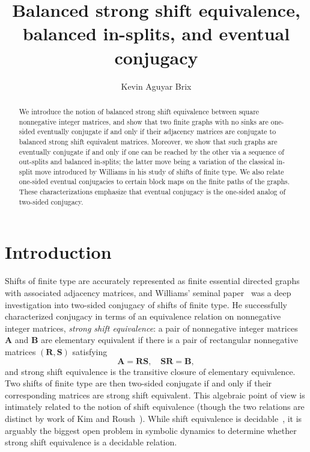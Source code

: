\documentclass[12pt,a4paper,oneside,reqno,final]{amsart}
\title[Eventual conjugacy]{Balanced strong shift equivalence, balanced in-splits, and eventual conjugacy}
\author[K.A. Brix]{Kevin Aguyar Brix}
\theoremstyle{definition}
\numberwithin{equation}{section} %
\begin{document}
\begin{abstract}
    We introduce the notion of balanced strong shift equivalence between square nonnegative integer matrices, 
    and show that two finite graphs with no sinks are one-sided eventually conjugate if and only if their adjacency matrices are conjugate to balanced strong shift equivalent matrices.
    Moreover, we show that such graphs are eventually conjugate if and only if one can be reached by the other via a sequence of out-splits and balanced in-splits;
    the latter move being a variation of the classical in-split move introduced by Williams in his study of shifts of finite type.
    We also relate one-sided eventual conjugacies to certain block maps on the finite paths of the graphs.
    These characterizations emphasize that eventual conjugacy is the one-sided analog of two-sided conjugacy.
\end{abstract}
\maketitle




\section{Introduction}
Shifts of finite type are accurately represented as finite essential directed graphs with associated adjacency matrices,
and Williams' seminal paper~\cite{Williams1973} was a deep investigation into two-sided conjugacy of shifts of finite type.
He successfully characterized conjugacy in terms of an equivalence relation on nonnegative integer matrices, \emph{strong shift equivalence}:
a pair of nonnegative integer matrices \textbf{A} and \textbf{B} are elementary equivalent if there is a pair of rectangular nonnegative matrices $(\textbf{R}, \textbf{S})$ satisfying
\[
    \textbf{A} = \textbf{R} \textbf{S}, \quad \textbf{S} \textbf{R} = \textbf{B},
\]
and strong shift equivalence is the transitive closure of elementary equivalence.
Two shifts of finite type are then two-sided conjugate if and only if their corresponding matrices are strong shift equivalent.
This algebraic point of view is intimately related to the notion of shift equivalence (though the two relations are distinct by work of Kim and Roush~\cite{Kim-Roush}).
While shift equivalence is decidable~\cite{Kim-Roush1988}, it is arguably the biggest open problem in symbolic dynamics to determine whether strong shift equivalence is a decidable relation.
\end{document}
